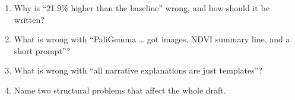 \begin{selfcheck}
\begin{enumerate}
  \item Why is ``21.9\% higher than the baseline'' wrong, and how should it be written?
  \item What is wrong with ``PaliGemma \dots{} got images, NDVI summary line, and a short prompt''?
  \item What is wrong with ``all narrative explanations are just templates''?
  \item Name two structural problems that affect the whole draft.
\end{enumerate}
\end{selfcheck}
